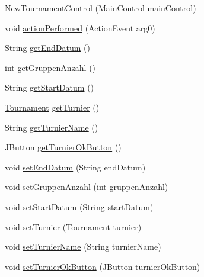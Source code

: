 \begin{DoxyCompactItemize}
\item 
\hyperlink{classde_1_1turnierverwaltung_1_1control_1_1_new_tournament_control_a90cd97f987a917f4476f081eb7f1dd50}{New\+Tournament\+Control} (\hyperlink{classde_1_1turnierverwaltung_1_1control_1_1_main_control}{Main\+Control} main\+Control)
\item 
void \hyperlink{classde_1_1turnierverwaltung_1_1control_1_1_new_tournament_control_a4bdc15bb0b685ea8054429722b3b6103}{action\+Performed} (Action\+Event arg0)
\item 
String \hyperlink{classde_1_1turnierverwaltung_1_1control_1_1_new_tournament_control_ab93d1b4e894929dfb774937d1dec70d4}{get\+End\+Datum} ()
\item 
int \hyperlink{classde_1_1turnierverwaltung_1_1control_1_1_new_tournament_control_a55eef01550572d5529a38cd4eff2642c}{get\+Gruppen\+Anzahl} ()
\item 
String \hyperlink{classde_1_1turnierverwaltung_1_1control_1_1_new_tournament_control_aaca437fbf0ee1b9156d7e3fc9c895869}{get\+Start\+Datum} ()
\item 
\hyperlink{classde_1_1turnierverwaltung_1_1model_1_1_tournament}{Tournament} \hyperlink{classde_1_1turnierverwaltung_1_1control_1_1_new_tournament_control_a1e334b7b5f38cb7f41ef2d7ff7b15874}{get\+Turnier} ()
\item 
String \hyperlink{classde_1_1turnierverwaltung_1_1control_1_1_new_tournament_control_a1dcf3be9bd2f7e215e06195c5f8a7e9f}{get\+Turnier\+Name} ()
\item 
J\+Button \hyperlink{classde_1_1turnierverwaltung_1_1control_1_1_new_tournament_control_a11e9e41be9f39c6b67f1a9bc56b93ffa}{get\+Turnier\+Ok\+Button} ()
\item 
void \hyperlink{classde_1_1turnierverwaltung_1_1control_1_1_new_tournament_control_a9320eab01f742a22537b49944c3f3a9c}{set\+End\+Datum} (String end\+Datum)
\item 
void \hyperlink{classde_1_1turnierverwaltung_1_1control_1_1_new_tournament_control_a351eed69f3de4917f55716ec72888025}{set\+Gruppen\+Anzahl} (int gruppen\+Anzahl)
\item 
void \hyperlink{classde_1_1turnierverwaltung_1_1control_1_1_new_tournament_control_a9c1f0a38ba59d716b4a18c3ba2c1d958}{set\+Start\+Datum} (String start\+Datum)
\item 
void \hyperlink{classde_1_1turnierverwaltung_1_1control_1_1_new_tournament_control_a35422ad64de38b2a7663929caf6406d6}{set\+Turnier} (\hyperlink{classde_1_1turnierverwaltung_1_1model_1_1_tournament}{Tournament} turnier)
\item 
void \hyperlink{classde_1_1turnierverwaltung_1_1control_1_1_new_tournament_control_a49045efd5853061d5f9153b4f0aef6a3}{set\+Turnier\+Name} (String turnier\+Name)
\item 
void \hyperlink{classde_1_1turnierverwaltung_1_1control_1_1_new_tournament_control_a5642a3d4a60c9140a8e22dafa9223ac0}{set\+Turnier\+Ok\+Button} (J\+Button turnier\+Ok\+Button)
\end{DoxyCompactItemize}


